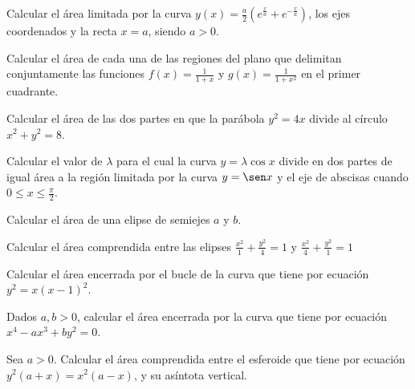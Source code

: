 \begin{ejercicio}
    Calcular el área limitada por la curva $y(x)=\frac{a}{2}\left(e^{\frac{x}{a}} + e^{-\frac{x}{a}}\right)$, los ejes coordenados y la recta $x=a$, siendo $a>0$.
\end{ejercicio}

\begin{ejercicio}
    Calcular el área de cada una de las regiones del plano que delimitan conjuntamente las funciones $f(x)=\frac{1}{1+x}$ y $g(x)=\frac{1}{1+x^2}$ en el primer cuadrante.
\end{ejercicio}

\begin{ejercicio}
    Calcular el área de las dos partes en que la parábola $y^2=4x$ divide al círculo $x^2+y^2=8$.
\end{ejercicio}

\begin{ejercicio}
    Calcular el valor de $\lambda$ para el cual la curva $y=\lambda \cos x$ divide en dos partes de igual área a la región limitada por la curva $y=\sen x$ y el eje de abscisas cuando $0\leq x \leq \frac{\pi}{2}$.
\end{ejercicio}

\begin{ejercicio}
    Calcular el área de una elipse de semiejes $a$ y $b$.
\end{ejercicio}

\begin{ejercicio}
    Calcular el área comprendida entre las elipses $\frac{x^2}{1} + \frac{y^2}{4}=1$ y $\frac{x^2}{4} + \frac{y^2}{1}=1$
\end{ejercicio}

\begin{ejercicio}
    Calcular el área encerrada por el bucle de la curva que tiene por ecuación $y^2=x(x-1)^2$.
\end{ejercicio}

\begin{ejercicio}
    Dados $a,b>0$, calcular el área encerrada por la curva que tiene por ecuación $x^4-ax^3+by^2=0$.
\end{ejercicio}

\begin{ejercicio}
    Sea $a>0$. Calcular el área comprendida entre el esferoide que tiene por ecuación $y^2(a+x)=x^2(a-x)$, y su asíntota vertical.
\end{ejercicio}

